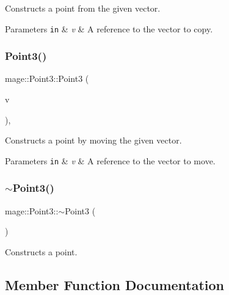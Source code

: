 Constructs a point from the given vector.


\begin{DoxyParams}[1]{Parameters}
\mbox{\tt in}  & {\em v} & A reference to the vector to copy. \\
\hline
\end{DoxyParams}
\hypertarget{structmage_1_1_point3_a56b75e7d5d8803ffd2c3b11f087816d1}{}\label{structmage_1_1_point3_a56b75e7d5d8803ffd2c3b11f087816d1} 
\subsubsection{\texorpdfstring{Point3()}{Point3()}\hspace{0.1cm}{\footnotesize\ttfamily [6/6]}}
{\footnotesize\ttfamily mage\+::\+Point3\+::\+Point3 (\begin{DoxyParamCaption}\item[{X\+M\+F\+L\+O\+A\+T3 \&\&}]{v }\end{DoxyParamCaption})\hspace{0.3cm}{\ttfamily [explicit]}, {\ttfamily [noexcept]}}

Constructs a point by moving the given vector.


\begin{DoxyParams}[1]{Parameters}
\mbox{\tt in}  & {\em v} & A reference to the vector to move. \\
\hline
\end{DoxyParams}
\hypertarget{structmage_1_1_point3_a952151b6ff72b68569f95445c2ac2495}{}\label{structmage_1_1_point3_a952151b6ff72b68569f95445c2ac2495} 
\subsubsection{\texorpdfstring{$\sim$\+Point3()}{~Point3()}}
{\footnotesize\ttfamily mage\+::\+Point3\+::$\sim$\+Point3 (\begin{DoxyParamCaption}{ }\end{DoxyParamCaption})\hspace{0.3cm}{\ttfamily [default]}}

Constructs a point. 

\subsection{Member Function Documentation}
\hypertarget{structmage_1_1_point3_a9b2178183cdb9e8d1ab6eaf9702b0786}{}\label{structmage_1_1_point3_a9b2178183cdb9e8d1ab6eaf9702b0786} 
